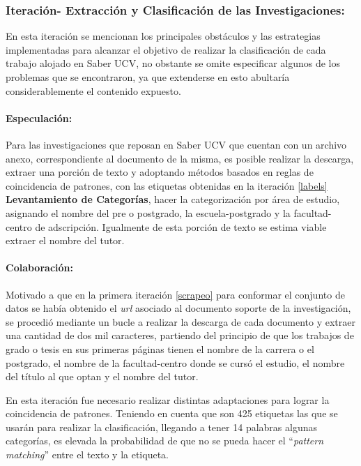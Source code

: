 \documentclass[
  12pt,
  openany]{book}
\begin{document}
\hypertarget{asignacion}{%
\subsubsection{Iteración- Extracción y Clasificación de las Investigaciones:}\label{asignacion}}

En esta iteración se mencionan los principales obstáculos y las estrategias implementadas para alcanzar el objetivo de realizar la clasificación de cada trabajo alojado en Saber UCV, no obstante se omite especificar algunos de los problemas que se encontraron, ya que extenderse en esto abultaría considerablemente el contenido expuesto.

\hypertarget{especulaciuxf3n-3}{%
\paragraph{Especulación:}\label{especulaciuxf3n-3}}

Para las investigaciones que reposan en Saber UCV que cuentan con un archivo anexo, correspondiente al documento de la misma, es posible realizar la descarga, extraer una porción de texto y adoptando métodos basados en reglas de coincidencia de patrones, con las etiquetas obtenidas en la iteración \ref{labels} \textbf{Levantamiento de Categorías}, hacer la categorización por área de estudio, asignando el nombre del pre o postgrado, la escuela-postgrado y la facultad-centro de adscripción. Igualmente de esta porción de texto se estima viable extraer el nombre del tutor.

\hypertarget{colaboraciuxf3n-3}{%
\paragraph{Colaboración:}\label{colaboraciuxf3n-3}}

Motivado a que en la primera iteración \ref{scrapeo} para conformar el conjunto de datos se había obtenido el \emph{url} asociado al documento soporte de la investigación, se procedió mediante un bucle a realizar la descarga de cada documento y extraer una cantidad de dos mil caracteres, partiendo del principio de que los trabajos de grado o tesis en sus primeras páginas tienen el nombre de la carrera o el postgrado, el nombre de la facultad-centro donde se cursó el estudio, el nombre del título al que optan y el nombre del tutor.

En esta iteración fue necesario realizar distintas adaptaciones para lograr la coincidencia de patrones. Teniendo en cuenta que son 425 etiquetas las que se usarán para realizar la clasificación, llegando a tener 14 palabras algunas categorías, es elevada la probabilidad de que no se pueda hacer el ``\emph{pattern matching}'' entre el texto y la etiqueta.
\end{document}
